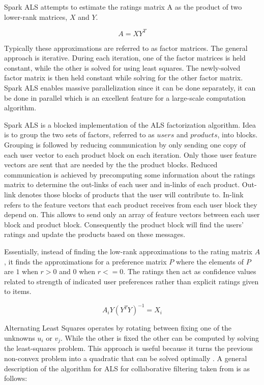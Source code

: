 \documentclass[main.tex]{thesis.tex}
\begin{document}
Spark ALS attempts to estimate the ratings matrix A as the product of two lower-rank matrices, $X$ and $Y$. \cite{als14}

\begin{equation}
A = XY^T
\end{equation}

Typically these approximations are referred to as factor matrices.
The general approach is iterative.
During each iteration, one of the factor matrices is held constant, while the other is solved for using least squares. The newly-solved factor matrix is then held constant while solving for the other factor matrix. \cite{als14}
Spark ALS enables massive parallelization since it can be done separately, it can be done in parallel which is an excellent feature for a large-scale computation algorithm. \cite{ryza15}

Spark ALS is a blocked implementation of the ALS factorization algorithm.
Idea is to group the two sets of factors, referred to as $users$ and $products$, into blocks.
Grouping is followed by reducing communication by only sending one copy of each user vector to each product block on each iteration.
Only those user feature vectors are sent that are needed by the the product blocks.
Reduced communication is achieved by precomputing some information about the ratings matrix to determine the out-links of each user and in-links of each product.
Out-link denotes those blocks of products that the user will contribute to.
In-link refers to the feature vectors that each product receives from each user block they depend on.
This allows to send only an array of feature vectors between each user block and product block.
Consequently the product block will find the users' ratings and update the products based on these messages. \cite{als14}

Essentially, instead of finding the low-rank approximations to the rating matrix $A$, it finds the approximations for a preference matrix $P$ where the elements of $P$ are $1$ when $r > 0$ and $0$ when $r <= 0$.
The ratings then act as confidence values related to strength of indicated user preferences rather than explicit ratings given to items. \cite{als14}

\begin{equation}
A_iY(Y^T Y)^{-1} = X_i
\end{equation}

Alternating Least Squares operates by rotating between fixing one of the unknowns $u_i$ or $v_j$.
While the other is fixed the other can be computed by solving the least-squares problem.
This approach is useful because it turns the previous non-convex problem into a quadratic that can be solved optimally \cite{aberger14}.
A general description of the algorithm for ALS for collaborative filtering taken from \cite{aberger14} is as follows:
\end{document}

